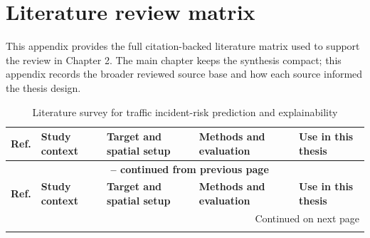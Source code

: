 \chapter{Literature review matrix}

This appendix provides the full citation-backed literature matrix used to support the review in Chapter 2. The main chapter keeps the synthesis compact; this appendix records the broader reviewed source base and how each source informed the thesis design.

\begingroup
\scriptsize
\setlength{\tabcolsep}{3pt}
\renewcommand{\arraystretch}{1.18}
\begin{longtable}{|p{0.8cm}|p{2.4cm}|p{3.0cm}|p{3.2cm}|p{3.9cm}|}
\caption{Literature survey for traffic incident-risk prediction and explainability}\label{tab:appendix_literature_matrix} \\
\hline
\textbf{Ref.} & \textbf{Study context} & \textbf{Target and spatial setup} & \textbf{Methods and evaluation} & \textbf{Use in this thesis} \\
\hline
\endfirsthead

\multicolumn{5}{c}{\bfseries \tablename\ \thetable{} -- continued from previous page} \\
\hline
\textbf{Ref.} & \textbf{Study context} & \textbf{Target and spatial setup} & \textbf{Methods and evaluation} & \textbf{Use in this thesis} \\
\hline
\endhead

\hline \multicolumn{5}{|r|}{Continued on next page} \\ \hline
\endfoot

\hline
\endlastfoot


\end{longtable}
